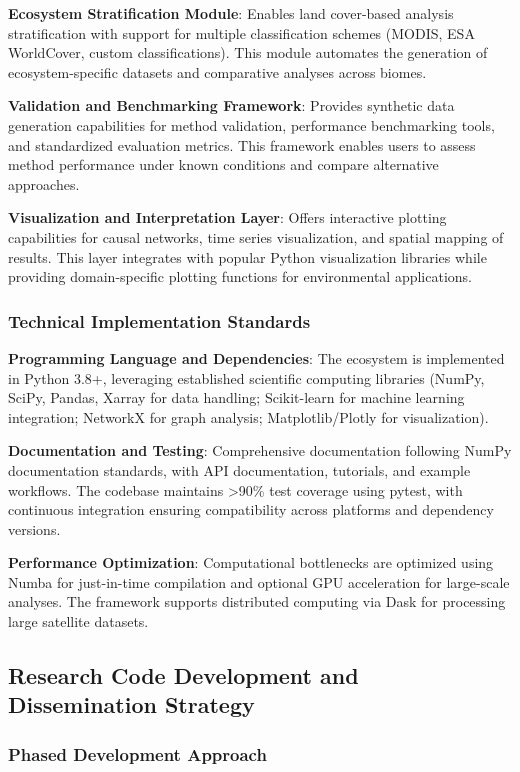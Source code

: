 \textbf{Ecosystem Stratification Module}: Enables land cover-based analysis stratification with support for multiple classification schemes (MODIS, ESA WorldCover, custom classifications). This module automates the generation of ecosystem-specific datasets and comparative analyses across biomes.

\textbf{Validation and Benchmarking Framework}: Provides synthetic data generation capabilities for method validation, performance benchmarking tools, and standardized evaluation metrics. This framework enables users to assess method performance under known conditions and compare alternative approaches.

\textbf{Visualization and Interpretation Layer}: Offers interactive plotting capabilities for causal networks, time series visualization, and spatial mapping of results. This layer integrates with popular Python visualization libraries while providing domain-specific plotting functions for environmental applications.

\subsubsection{Technical Implementation Standards}

\textbf{Programming Language and Dependencies}: The ecosystem is implemented in Python 3.8+, leveraging established scientific computing libraries (NumPy, SciPy, Pandas, Xarray for data handling; Scikit-learn for machine learning integration; NetworkX for graph analysis; Matplotlib/Plotly for visualization).

\textbf{Documentation and Testing}: Comprehensive documentation following NumPy documentation standards, with API documentation, tutorials, and example workflows. The codebase maintains >90\% test coverage using pytest, with continuous integration ensuring compatibility across platforms and dependency versions.

\textbf{Performance Optimization}: Computational bottlenecks are optimized using Numba for just-in-time compilation and optional GPU acceleration for large-scale analyses. The framework supports distributed computing via Dask for processing large satellite datasets.

\subsection{Research Code Development and Dissemination Strategy}

\subsubsection{Phased Development Approach}

